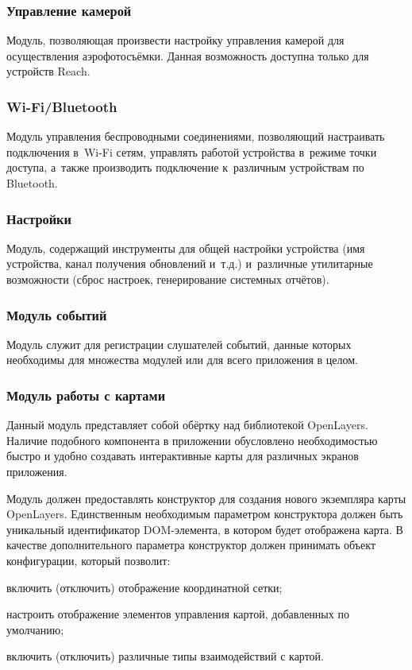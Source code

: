 \subsubsection{Управление камерой}

Модуль, позволяющая произвести настройку управления камерой для осуществления аэрофотосъёмки. Данная возможность доступна только для устройств Reach.

\subsubsection{Wi-Fi/Bluetooth}

Модуль управления беспроводными соединениями, позволяющий настраивать подключения в~Wi-Fi сетям, управлять работой устройства в~режиме точки доступа, а~также производить подключение к~различным устройствам по Bluetooth.

\subsubsection{Настройки}

Модуль, содержащий инструменты для общей настройки устройства (имя устройства, канал получения обновлений и~т.д.) и~различные утилитарные возможности (сброс настроек, генерирование системных отчётов).

\subsubsection{Модуль событий}

Модуль служит для регистрации слушателей событий, данные которых необходимы для множества модулей или для всего приложения в целом.

\subsubsection{Модуль работы с картами}

Данный модуль представляет собой обёртку над библиотекой OpenLayers. Наличие подобного компонента в приложении обусловлено необходимостью быстро и удобно создавать интерактивные карты для различных экранов приложения.

Модуль должен предоставлять конструктор для создания нового экземпляра карты OpenLayers. Единственным необходимым параметром конструктора должен быть уникальный идентификатор DOM-элемента, в котором будет отображена карта. В качестве дополнительного параметра конструктор должен принимать объект конфигурации, который позволит:
\begin{dashitemize}
  \item включить (отключить) отображение координатной сетки;
  \item настроить отображение элементов управления картой, добавленных по умолчанию;
  \item включить (отключить) различные типы взаимодействий с картой.
\end{dashitemize}

